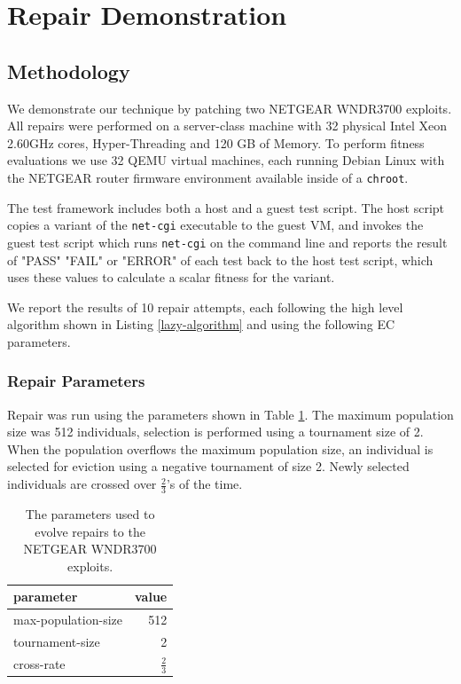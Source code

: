 \documentclass{sigcomm-alternate}
\begin{document}
\section{Repair Demonstration}
\label{sec-4}
\subsection{Methodology}
\label{sec-4-1}
We demonstrate our technique by patching two NETGEAR WNDR3700
exploits.  All repairs were performed on a server-class machine with
32 physical Intel Xeon 2.60GHz cores, Hyper-Threading and 120 GB of
Memory.  To perform fitness evaluations we use 32 QEMU virtual
machines, each running Debian Linux with the NETGEAR router firmware
environment available inside of a \texttt{chroot}.

The test framework includes both a host and a guest test script.  The
host script copies a variant of the \texttt{net-cgi} executable to the guest
VM, and invokes the guest test script which runs \texttt{net-cgi} on the
command line and reports the result of "PASS" "FAIL" or "ERROR" of
each test back to the host test script, which uses these values to
calculate a scalar fitness for the variant.

We report the results of 10 repair attempts, each following the high
level algorithm shown in Listing \ref{lazy-algorithm} and using the
following EC parameters.

\subsubsection{Repair Parameters}
\label{sec-4-1-1}
Repair was run using the parameters shown in Table \ref{parameters}.  The
maximum population size was 512 individuals, selection is performed
using a tournament size of 2.  When the population overflows the
maximum population size, an individual is selected for eviction using
a negative tournament of size 2.  Newly selected individuals are
crossed over $\frac{2}{3}$'s of the time.

\begin{table}[htb]
\centering
\begin{tabular}{lr}
parameter           & value         \\
\hline
max-population-size & 512           \\
tournament-size     & 2             \\
cross-rate          & $\frac{2}{3}$ \\
\end{tabular}\caption{\label{parameters}The parameters used to evolve repairs to the NETGEAR WNDR3700 exploits.}

\end{table}
\end{document}
